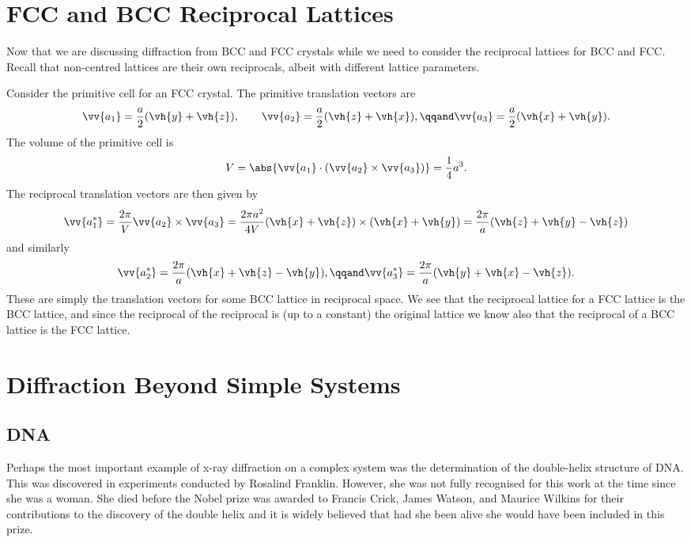 \documentclass[fleqn]{NotesClass}
\begin{document}
    \section{FCC and BCC Reciprocal Lattices}
    Now that we are discussing diffraction from BCC and FCC crystals while we need to consider the reciprocal lattices for BCC and FCC.
    Recall that non-centred lattices are their own reciprocals, albeit with different lattice parameters.
    
    Consider the primitive cell for an FCC crystal.
    The primitive translation vectors are
    \begin{equation}
        \vv{a_1} = \frac{a}{2}(\vh{y} + \vh{z}), \qquad \vv{a_2} = \frac{a}{2}(\vh{z} + \vh{x}), \qqand \vv{a_3} = \frac{a}{2}(\vh{x} + \vh{y}).
    \end{equation}
    The volume of the primitive cell is
    \begin{equation}
        V = \abs{\vv{a_1} \cdot (\vv{a_2} \times \vv{a_3})} = \frac{1}{4}a^3.
    \end{equation}
    The reciprocal translation vectors are then given by
    \begin{equation}
        \vv{a_1^*} = \frac{2\pi}{V}\vv{a_2}\times\vv{a_3} = \frac{2\pi a^2}{4V}(\vh{x} + \vh{z}) \times (\vh{x} + \vh{y}) = \frac{2\pi}{a}(\vh{z} + \vh{y} - \vh{z})
    \end{equation}
    and similarly
    \begin{equation}
        \vv{a_2^*} = \frac{2\pi}{a}(\vh{x} + \vh{z} - \vh{y}), \qqand \vv{a_3^*} = \frac{2\pi}{a}(\vh{y} + \vh{x} - \vh{z}).
    \end{equation}
    These are simply the translation vectors for some BCC lattice in reciprocal space.
    We see that the reciprocal lattice for a FCC lattice is the BCC lattice, and since the reciprocal of the reciprocal is (up to a constant) the original lattice we know also that the reciprocal of a BCC lattice is the FCC lattice.
    
    \section{Diffraction Beyond Simple Systems}
    \subsection{DNA}
    Perhaps the most important example of x-ray diffraction on a complex system was the determination of the double-helix structure of DNA.
    This was discovered in experiments conducted by Rosalind Franklin.
    However, she was not fully recognised for this work at the time since she was a woman.
    She died before the Nobel prize was awarded to Francis Crick, James Watson, and Maurice Wilkins for their contributions to the discovery of the double helix and it is widely believed that had she been alive she would have been included in this prize.
    
\end{document}
